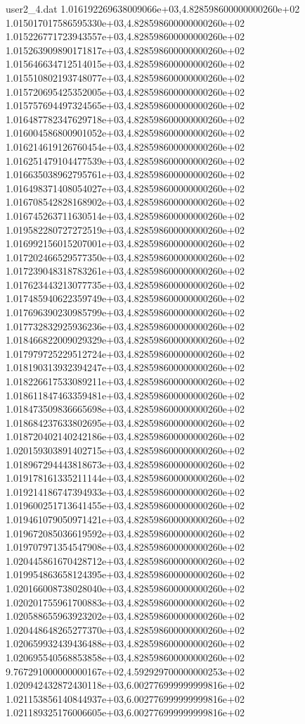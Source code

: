 \begin{filecontents}{user2_4.dat}
1.016192269638009066e+03,4.828598600000000260e+02
1.015017017586595330e+03,4.828598600000000260e+02
1.015226771723943557e+03,4.828598600000000260e+02
1.015263909890171817e+03,4.828598600000000260e+02
1.015646634712514015e+03,4.828598600000000260e+02
1.015510802193748077e+03,4.828598600000000260e+02
1.015720695425352005e+03,4.828598600000000260e+02
1.015757694497324565e+03,4.828598600000000260e+02
1.016487782347629718e+03,4.828598600000000260e+02
1.016004586800901052e+03,4.828598600000000260e+02
1.016214619126760454e+03,4.828598600000000260e+02
1.016251479104477539e+03,4.828598600000000260e+02
1.016635038962795761e+03,4.828598600000000260e+02
1.016498371408054027e+03,4.828598600000000260e+02
1.016708542828168902e+03,4.828598600000000260e+02
1.016745263711630514e+03,4.828598600000000260e+02
1.019582280727272519e+03,4.828598600000000260e+02
1.016992156015207001e+03,4.828598600000000260e+02
1.017202466529577350e+03,4.828598600000000260e+02
1.017239048318783261e+03,4.828598600000000260e+02
1.017623443213077735e+03,4.828598600000000260e+02
1.017485940622359749e+03,4.828598600000000260e+02
1.017696390230985799e+03,4.828598600000000260e+02
1.017732832925936236e+03,4.828598600000000260e+02
1.018466822009029329e+03,4.828598600000000260e+02
1.017979725229512724e+03,4.828598600000000260e+02
1.018190313932394247e+03,4.828598600000000260e+02
1.018226617533089211e+03,4.828598600000000260e+02
1.018611847463359481e+03,4.828598600000000260e+02
1.018473509836665698e+03,4.828598600000000260e+02
1.018684237633802695e+03,4.828598600000000260e+02
1.018720402140242186e+03,4.828598600000000260e+02
1.020159303891402715e+03,4.828598600000000260e+02
1.018967294443818673e+03,4.828598600000000260e+02
1.019178161335211144e+03,4.828598600000000260e+02
1.019214186747394933e+03,4.828598600000000260e+02
1.019600251713641455e+03,4.828598600000000260e+02
1.019461079050971421e+03,4.828598600000000260e+02
1.019672085036619592e+03,4.828598600000000260e+02
1.019707971354547908e+03,4.828598600000000260e+02
1.020445861670428712e+03,4.828598600000000260e+02
1.019954863658124395e+03,4.828598600000000260e+02
1.020166008738028040e+03,4.828598600000000260e+02
1.020201755961700883e+03,4.828598600000000260e+02
1.020588655963923202e+03,4.828598600000000260e+02
1.020448648265277370e+03,4.828598600000000260e+02
1.020659932439436488e+03,4.828598600000000260e+02
1.020695540568853858e+03,4.828598600000000260e+02
9.767291000000000167e+02,4.592929700000000253e+02
1.020942432872430118e+03,6.002776999999999816e+02
1.021153856140844937e+03,6.002776999999999816e+02
1.021189325176006605e+03,6.002776999999999816e+02

\end{filecontents}
